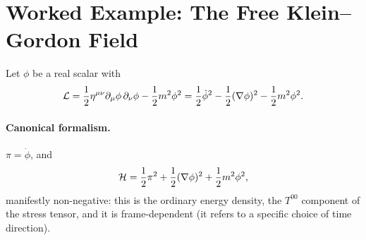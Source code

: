 \section{Worked Example: The Free Klein--Gordon Field}
\label{sec:kg-example}

Let $\phi$ be a real scalar with
\begin{equation}
\mathcal{L} = \frac{1}{2}\eta^{\mu\nu}\partial_\mu\phi\,\partial_\nu\phi
    - \frac{1}{2}m^2\phi^2
     = \frac{1}{2}\dot\phi^2 - \frac{1}{2}(\nabla\phi)^2 
     - \frac{1}{2}m^2\phi^2 .
\end{equation}

\paragraph{Canonical formalism.} $\pi=\dot\phi$, and
\begin{equation}
\mathcal{H} = \frac{1}{2}\pi^2 + \frac{1}{2}(\nabla\phi)^2 + \frac{1}{2}m^2\phi^2 ,
\end{equation}
manifestly non-negative: this is the ordinary energy density, the $T^{00}$
component of the stress tensor, and it is frame-dependent (it refers to a
specific choice of time direction).

